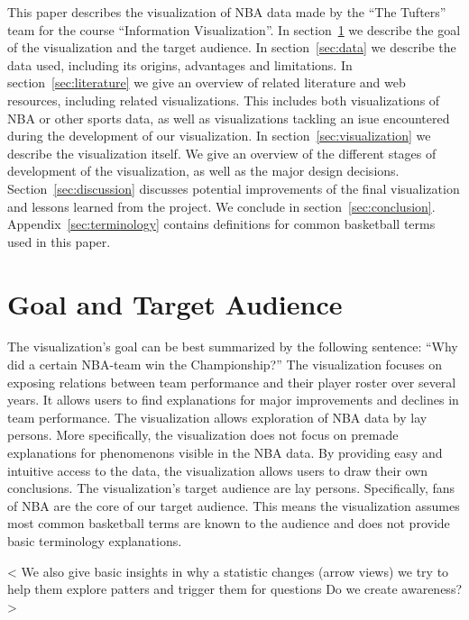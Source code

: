\documentclass{sigchi}
\begin{document}
This paper describes the visualization of NBA data made by the ``The Tufters''
team for the course ``Information Visualization''. In section~\ref{sec:goal} we
describe the goal of the visualization and the target audience. In
section~\ref{sec:data} we describe the data used, including its origins,
advantages and limitations. In section~\ref{sec:literature} we give an overview
of related literature and web resources, including related visualizations.
This includes both visualizations of NBA or other sports data, as well as
visualizations tackling an isue encountered during the development of our
visualization. In section~\ref{sec:visualization} we describe the visualization
itself. We give an overview of the different stages of development of the
visualization, as well as the major design decisions.
Section~\ref{sec:discussion} discusses potential improvements of the final
visualization and lessons learned from the project. We conclude in
section~\ref{sec:conclusion}. Appendix~\ref{sec:terminology} contains
definitions for common basketball terms used in this paper.

\section{Goal and Target Audience}\label{sec:goal} 
The visualization's goal can be best summarized by the following sentence:
``Why did a certain NBA-team win the Championship?'' The visualization focuses
on exposing relations between team performance and their player roster over
several years. It allows users to find explanations for major improvements and
declines in team performance.  The visualization allows exploration of NBA data
by lay persons.  More specifically, the visualization does not focus on premade
explanations for phenomenons visible in the NBA data. By providing easy and
intuitive access to the data, the visualization allows users to draw their own
conclusions. The visualization's target audience are lay persons. Specifically,
fans of NBA are the core of our target audience. This means the visualization
assumes most common basketball terms are known to the audience and does not
provide basic terminology explanations.

< We also give basic insights in why a
statistic changes (arrow views) we try to help them explore patters and trigger
them for questions Do we create awareness?  >
\end{document}
